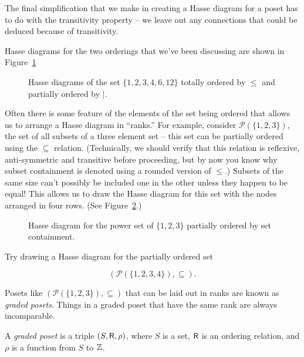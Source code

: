 The final simplification that we make in creating a Hasse diagram for
a poset has to do with the transitivity property -- we leave out any
connections that could be deduced because of transitivity.

Hasse diagrams for the two orderings that we've been discussing are 
shown in Figure~\ref{fig:hasse_diag}


\begin{figure}[!hbt]

\caption[Some simple Hasse diagrams.]{Hasse diagrams of the set $\{1,2,3,4,6,12\}$ %
totally ordered by $\leq$ and partially ordered by $\mid$.}
\label{fig:hasse_diag} 
\end{figure}

Often there is some feature of the elements of the set being ordered
that allows us to arrange a Hasse diagram in ``ranks.''  For example,
consider ${\mathcal P}(\{1,2,3\})$, the set of all subsets of a three
element set -- this set can be partially ordered using the $\subseteq$ 
relation.  (Technically, we should verify that this relation is reflexive,
anti-symmetric and transitive before proceeding, but by now you know
why subset containment is denoted using a rounded version of $\leq$.)
Subsets of the same size can't possibly be included one in the other
unless they happen to be equal!  This allows us to draw the Hasse 
diagram for this set with the nodes arranged in four rows. 
(See Figure~\ref{fig:subset_hasse}.)  

\begin{figure}[!hbtp]

\caption[Hasse diagram for $({\mathcal P}(\{1,2,3\}), \subseteq)$.]{Hasse %
diagram for the power set of $\{1,2,3\}$ partially ordered by %
set containment.}
\label{fig:subset_hasse} 
\end{figure}

\begin{exer}
Try drawing a Hasse diagram for the partially ordered set 

\[ ({\mathcal P}(\{1,2,3,4\}),\subseteq). \]

\end{exer}


Posets like $({\mathcal P}(\{1,2,3\}), \subseteq)$ that can be laid out
in ranks are known as  \emph{graded posets}.  Things
in a graded poset that have the same rank are always incomparable.

\begin{defi}
A \emph{graded poset} is a triple $(S, \mbox{\textsf R}, \rho)$, where $S$ is a set,
$\mbox{\textsf R}$ is an ordering relation, and $\rho$ is a function from $S$ to ${\mathbb Z}$.
\end{defi}

